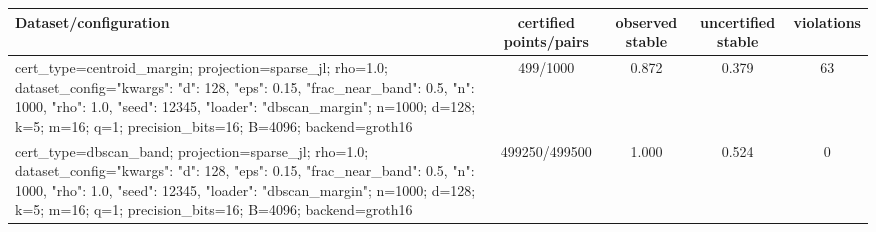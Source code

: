 \begin{tabular}{lcccc}
\toprule
Dataset/configuration & certified points/pairs & observed stable & uncertified stable & violations \\
\midrule
cert\_type=centroid\_margin; projection=sparse\_jl; rho=1.0; dataset\_config={"kwargs": {"d": 128, "eps": 0.15, "frac\_near\_band": 0.5, "n": 1000, "rho": 1.0, "seed": 12345}, "loader": "dbscan\_margin"}; n=1000; d=128; k=5; m=16; q=1; precision\_bits=16; B=4096; backend=groth16 & 499/1000 & 0.872 & 0.379 & 63 \\
cert\_type=dbscan\_band; projection=sparse\_jl; rho=1.0; dataset\_config={"kwargs": {"d": 128, "eps": 0.15, "frac\_near\_band": 0.5, "n": 1000, "rho": 1.0, "seed": 12345}, "loader": "dbscan\_margin"}; n=1000; d=128; k=5; m=16; q=1; precision\_bits=16; B=4096; backend=groth16 & 499250/499500 & 1.000 & 0.524 & 0 \\
\bottomrule
\end{tabular}
